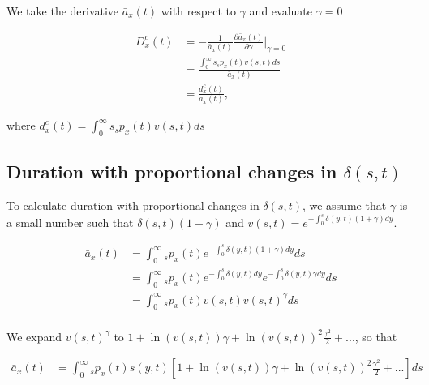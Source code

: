 \documentclass[12pt]{article}
\begin{document}
We take the derivative $\bar{a}_{x}(t)$ with respect to $\gamma$ and evaluate $\gamma=0$


\begin{equation}\label{eq:DurationConst2}
\begin{split}
{D}^{c}_x(t)&=-\frac{1}{\bar{a}_x(t)}\frac{\partial \bar{a}_x(t)}{\partial \gamma} \bigg\rvert_{\gamma=0}\\
              &= \frac{\int_0^\infty s {}_sp_x(t) {v}(s,t)ds}{\bar{a}_x(t)} \\
              &= \frac{{d}^{c}_x(t)}{\bar{a}_x(t)},
\end{split}
\end{equation}

where ${d}^{c}_x(t)=\int_0^\infty s {}_sp_x(t) {v}(s,t)ds$



\subsection{Duration with proportional changes in $\delta(s,t)$} \label{sec:DurProp}

To calculate duration with proportional changes in $\delta(s,t)$, we assume that $\gamma$ is a small number such that $\delta(s,t)(1+\gamma)$ and  ${v}(s,t)=e^{-\int_0^{s}  \delta(y,t)(1+\gamma)dy}$.


\begin{equation}\label{eq:DurationProp1}
\begin{split}
\bar{a} _x(t) &= \int_0^\infty {}_sp_x(t) e^{-\int_0^{s}\delta(y,t)(1+\gamma)dy}ds \\
&= \int_0^\infty {}_sp_x(t) e^{-\int_0^{s}\delta(y,t)dy}e^{-\int_0^{s}\delta(y,t)\gamma dy}ds \\
&= \int_0^\infty {}_sp_x(t) v(s,t)v(s,t)^{\gamma}ds \\
\end{split}
\end{equation}


We expand $v(s,t)^{\gamma}$ to $1+\ln(v(s,t)) \gamma+{\ln(v(s,t))}^2 \frac{\gamma^2}{2}+...$, so that


\begin{equation}\label{eq:DurationProp2}
\begin{split}
\bar{a}_x(t) &= \int_0^\infty {}_sp_x(t) s(y,t)[1+\ln(v(s,t)) \gamma+{\ln(v(s,t))}^2 \frac{\gamma^2}{2}+...]ds\\
\end{split}
\end{equation}
\end{document}

